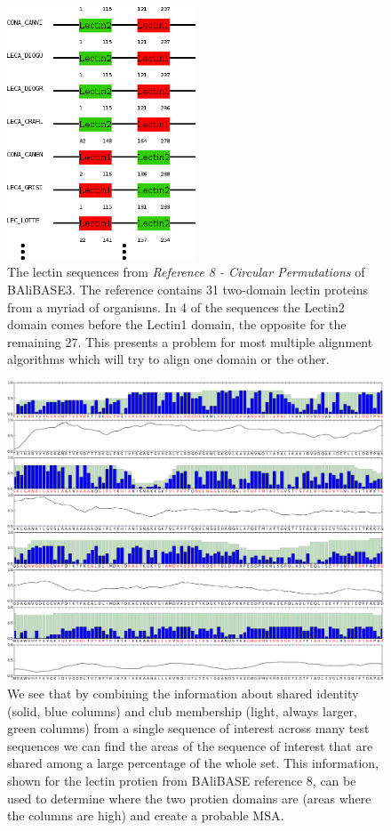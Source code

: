 \documentclass[phd,tocprelim]{cornell}
\begin{document}
 \begin{figure}[htp]%
 \centerline{\includegraphics[width=0.5\textwidth]{figures/velvetrope/BAliBASEsnap2v2.png}}
 \caption[Multiple alignment reference]{The lectin sequences from \textit{Reference 8 - Circular Permutations} of BAliBASE3. The reference contains 31 two-domain lectin proteins from a myriad of organisms. In 4 of the sequences the Lectin2 domain comes before the Lectin1 domain, the opposite for the remaining 27. This presents a problem for most multiple alignment algorithms which will try to align one domain or the other.}
 	\label{fig:vr04}
 \end{figure}
 
 \begin{figure}[htp]%
 \centerline{\includegraphics[width=\textwidth]{figures/velvetrope/COMBO1.png}}
 \caption[Velvetrope per-base output]{We see that by combining the information about shared identity (solid, blue columns) and club membership
(light, always larger, green columns) from a single sequence of interest across many test sequences we can
find the areas of the sequence of interest that are shared among a large percentage of the whole set. This
information, shown for the lectin protien from BAliBASE reference 8, can be used to determine where the
two protien domains are (areas where the columns are high) and create a probable MSA.}
 	\label{fig:vr05}
 \end{figure}
 
\end{document}

